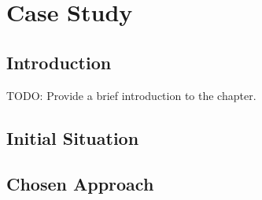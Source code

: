 \chapter{Case Study}
\label{sec:case_study}

\section{Introduction}
TODO: Provide a brief introduction to the chapter.

\section{Initial Situation}

\section{Chosen Approach}